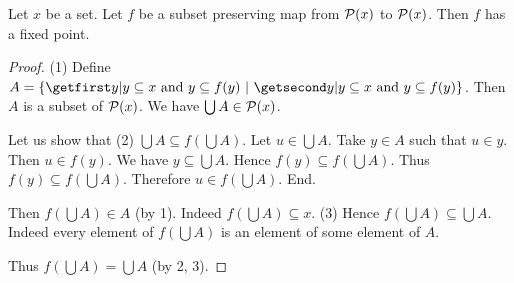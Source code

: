 \documentclass[../../set-theory/set-theory.tex]{subfiles}
\begin{document}
  \begin{forthel}
    \begin{theorem}
      Let $x$ be a set.
      Let $f$ be a subset preserving map from $\mathcal{P}(x)$ to $\mathcal{P}(x)$.
      Then $f$ has a fixed point.
    \end{theorem}
    \begin{proof}
      (1) Define $A = \class{y | \text{$y \subseteq x$ and
      $y \subseteq f(y)$}}$.
      Then $A$ is a subset of $\mathcal{P}(x)$.
      We have $\bigcup A \in \mathcal{P}(x)$.

      Let us show that (2) $\bigcup A \subseteq f(\bigcup A)$.
        Let $u \in \bigcup A$.
        Take $y \in A$ such that $u \in y$.
        Then $u \in f(y)$.
        We have $y \subseteq \bigcup A$.
        Hence $f(y) \subseteq f(\bigcup A)$.
        Thus $f(y) \subseteq f(\bigcup A)$.
        Therefore $u \in f(\bigcup A)$.
      End.

      Then $f(\bigcup A) \in A$ (by 1).
      Indeed $f(\bigcup A) \subseteq x$.
      (3) Hence $f(\bigcup A) \subseteq \bigcup A$.
      Indeed every element of $f(\bigcup A)$ is an element of some element of
      $A$.

      Thus $f(\bigcup A) = \bigcup A$ (by 2, 3).
    \end{proof}
  \end{forthel}
\end{document}

